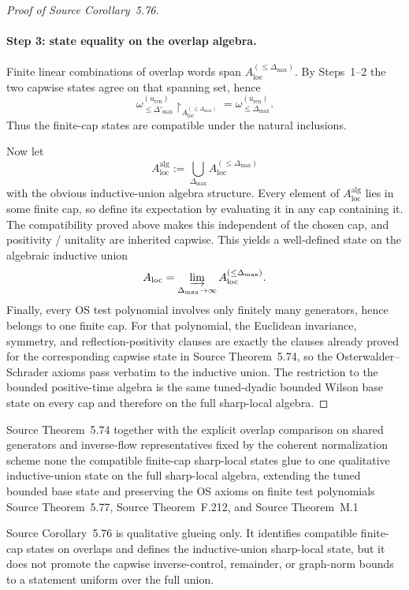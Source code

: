 \begin{proof}[Proof of Source Corollary~5.76]
\paragraph*{Step 3: state equality on the overlap algebra.}
Finite linear combinations of overlap words span $A_{\mathrm{loc}}^{(\le \Delta_{\max})}$. By Steps~1--2 the two capwise states agree on that spanning set, hence
\[
\omega^{(u_{\mathrm{ren}})}_{\le \Delta'_{\max}}\!\upharpoonright_{A_{\mathrm{loc}}^{(\le \Delta_{\max})}}=\omega^{(u_{\mathrm{ren}})}_{\le \Delta_{\max}}.
\]
Thus the finite-cap states are compatible under the natural inclusions.

Now let
\[
A_{\mathrm{loc}}^{\mathrm{alg}}:=\bigcup_{\Delta_{\max}}A_{\mathrm{loc}}^{(\le \Delta_{\max})}
\]
with the obvious inductive-union algebra structure. Every element of $A_{\mathrm{loc}}^{\mathrm{alg}}$ lies in some finite cap, so define its expectation by evaluating it in any cap containing it. The compatibility proved above makes this independent of the chosen cap, and positivity / unitality are inherited capwise. This yields a well-defined state on the algebraic inductive union
\[
A_{\mathrm{loc}}=\varinjlim_{\Delta_{\max}\to\infty}A_{\mathrm{loc}}^{(\le \Delta_{\max})}.
\]
Finally, every OS test polynomial involves only finitely many generators, hence belongs to one finite cap. For that polynomial, the Euclidean invariance, symmetry, and reflection-positivity clauses are exactly the clauses already proved for the corresponding capwise state in Source Theorem~5.74, so the Osterwalder--Schrader axioms pass verbatim to the inductive union. The restriction to the bounded positive-time algebra is the same tuned-dyadic bounded Wilson base state on every cap and therefore on the full sharp-local algebra.
\end{proof}

\dependencyledger
  {Source Theorem~5.74 together with the explicit overlap comparison on shared generators and inverse-flow representatives fixed by the coherent normalization scheme}
  {none}
  {the compatible finite-cap sharp-local states glue to one qualitative inductive-union state on the full sharp-local algebra, extending the tuned bounded base state and preserving the OS axioms on finite test polynomials}
  {Source Theorem~5.77, Source Theorem~F.212, and Source Theorem~M.1}

\begin{remark}
Source Corollary~5.76 is qualitative glueing only. It identifies compatible finite-cap states on overlaps and defines the inductive-union sharp-local state, but it does not promote the capwise inverse-control, remainder, or graph-norm bounds to a statement uniform over the full union.
\end{remark}

